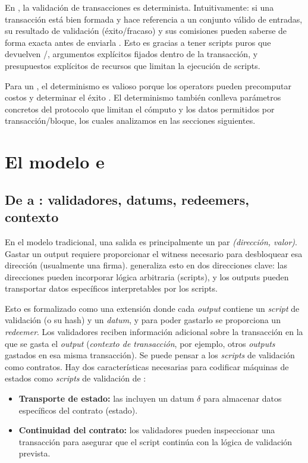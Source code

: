 En \Cardano, la validación de transacciones es determinista. Intuitivamente: si una transacción está bien formada y hace referencia a un conjunto válido de entradas, su resultado de validación (éxito/fracaso) y sus comisiones pueden saberse de forma exacta antes de enviarla \Onchain. Esto es gracias a tener scripts puros que devuelven \True/\False, argumentos explícitos fijados dentro de la transacción, y presupuestos explícitos de recursos que limitan la ejecución de scripts.

Para un \zkBridge, el determinismo es valioso porque los \Bridge operators pueden precomputar costos y determinar el éxito \Offchain. El determinismo también conlleva parámetros concretos del protocolo que limitan el cómputo y los datos permitidos por transacción/bloque, los cuales analizamos en las secciones siguientes.

\section{El modelo e\UTxO}

\subsection{De \UTxO a \eUTxO: validadores, datums, redeemers, contexto}

En el modelo \UTxO tradicional, una salida es principalmente un par \emph{(dirección, valor)}. Gastar un output requiere proporcionar el witness necesario para desbloquear esa dirección (usualmente una firma). \Cardano generaliza esto en dos direcciones clave: las direcciones pueden incorporar lógica arbitraria (scripts), y los outputs pueden transportar datos específicos interpretables por los scripts.

Esto es formalizado \cite{Chakravarty2020} como una extensión donde cada \textit{output} contiene un \textit{script} de validación (o su hash) y un \textit{datum}, y para poder gastarlo se proporciona un \textit{redeemer}. Los validadores reciben información adicional sobre la transacción en la que se gasta el \textit{output} (\emph{contexto de transacción}, por ejemplo, otros \textit{outputs} gastados en esa misma transacción). Se puede pensar a los \textit{scripts} de validación como contratos. Hay dos características necesarias para codificar máquinas de estados como \textit{scripts} de validación de \Cardano:

\begin{itemize}[noitemsep]
	\item \textbf{Transporte de estado:} las incluyen un datum $\delta$ para almacenar datos específicos del contrato (estado).
	\item \textbf{Continuidad del contrato:} los validadores pueden inspeccionar una transacción para asegurar que el script continúa con la lógica de validación prevista.
\end{itemize}

